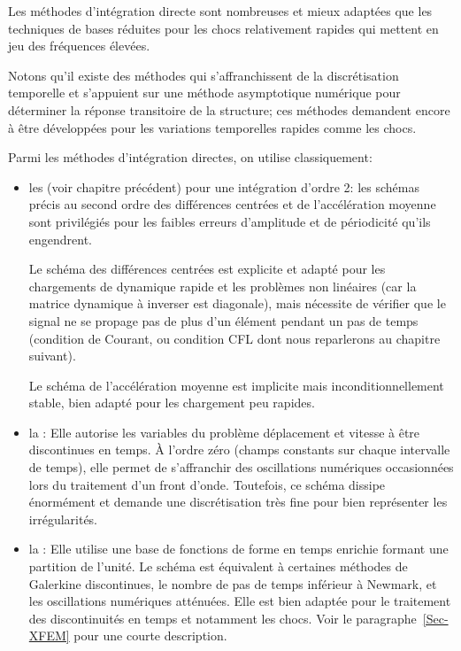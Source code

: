 Les méthodes d'intégration directe sont nombreuses et mieux adaptées que les techniques de bases réduites pour les chocs relativement rapides qui mettent en jeu des fréquences élevées.

Notons qu'il existe des méthodes qui s'affranchissent de la discrétisation temporelle et s'appuient sur une méthode asymptotique numérique pour déterminer la réponse transitoire de la structure; ces méthodes demandent encore à être développées pour les variations temporelles rapides comme les chocs.

Parmi les méthodes d'intégration directes, on utilise classiquement:
\begin{itemize}
	\item les  (voir chapitre précédent) pour une intégration d'ordre 2: 		les schémas précis au second ordre des différences centrées et de l'accélération moyenne sont privilégiés pour les faibles erreurs d'amplitude et de périodicité qu'ils engendrent.
		
		Le schéma des différences centrées
		est explicite et adapté pour les chargements de dynamique rapide et les
		problèmes non linéaires (car la matrice dynamique à inverser est diagonale),
		mais nécessite de vérifier que le signal ne se propage pas de plus d'un élément
		pendant un pas de temps (condition de Courant, ou condition CFL dont nous reparlerons au chapitre suivant).
		
		Le schéma de l'accélération moyenne est implicite mais inconditionnellement
		stable, bien adapté pour les chargement peu rapides.
	\item la :
		Elle autorise les variables du problème déplacement et vitesse à être
		discontinues en temps.
		À l'ordre zéro (champs constants sur chaque intervalle de temps), elle permet
		de s'affranchir des oscillations numériques occasionnées lors du traitement
		d'un front d'onde.
		Toutefois, ce schéma dissipe énormément et demande une discrétisation
		très fine pour bien représenter les irrégularités.
	\item la :
		Elle utilise une base de fonctions de forme en temps enrichie formant une partition de l'unité. Le schéma est équivalent à certaines méthodes de Galerkine discontinues, le nombre de pas de temps inférieur à Newmark, et les oscillations numériques atténuées.
		Elle est bien adaptée pour le traitement des discontinuités en temps et
		notamment les chocs. Voir le paragraphe~\ref{Sec-XFEM} pour une courte description.
\end{itemize}

